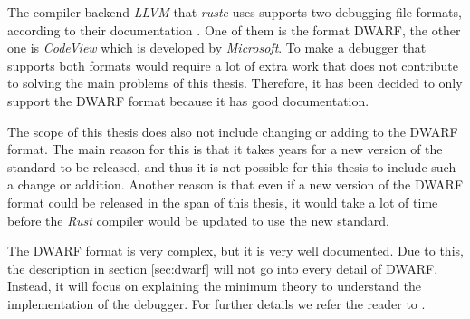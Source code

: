 The compiler backend \emph{LLVM} that \emph{rustc} uses supports two debugging file formats, according to their documentation \cite{llvm-dbs}.
One of them is the format \gls{DWARF}, the other one is \emph{CodeView} which is developed by \emph{Microsoft}.
To make a debugger that supports both formats would require a lot of extra work that does not contribute to solving the main problems of this thesis.
Therefore, it has been decided to only support the \gls{DWARF} format because it has good documentation.


The scope of this thesis does also not include changing or adding to the \gls{DWARF} format.
The main reason for this is that it takes years for a new version of the standard to be released, and thus it is not possible for this thesis to include such a change or addition.
Another reason is that even if a new version of the \gls{DWARF} format could be released in the span of this thesis, it would take a lot of time before the \emph{Rust} compiler would be updated to use the new standard.


The \gls{DWARF} format is very complex, but it is very well documented.
Due to this, the description in section \ref{sec:dwarf} will not go into every detail of \gls{DWARF}.
Instead, it will focus on explaining the minimum theory to understand the implementation of the debugger.
For further details we refer the reader to \cite{dwarf}.


